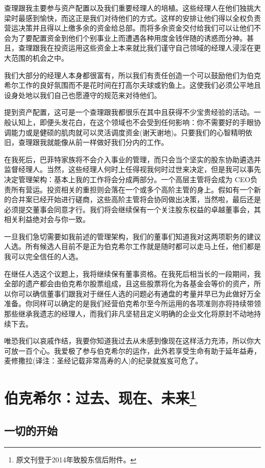 \documentclass[UTF8,a4paper,zihao=-4,fontset = windows]{ctexart} %
\begin{document}
查理跟我主要参与资产配置以及我们重要经理人的培植。这些经理人在他们独挑大梁时最感到愉快，而这正是我们对待他们的方式。这样的安排让他们得以全权负责营运决策并且得以上缴多余的资金给总部。而将多余资金交付给我们可以让他们不会为了要配置资金到他们个别事业上而遭遇各种用度金钱伴随的诱惑而分神。甚且，查理跟我在投资运用这些资金上本来就比我们谨守自己领域的经理人浸淫在更大范围的机会之中。

我们大部分的经理人本身都很富有，所以我们有责任创造一个可以鼓励他们为伯克希尔工作的良好氛围而不是花时间在打高尔夫球或钓鱼上。这使我们必须公平地且设身处地以我们自己也愿遵守的规范来对待他们。

提到资产配置，这可是一个查理跟我都很乐在其中且获得不少宝贵经验的活动。一般认知上，即便头发花白，在这个领域也不会受到任何影响：你不需要好的手眼协调能力或是健硕的肌肉就可以灵活调度资金(谢天谢地)。只要我们的心智精明依旧，查理跟我就能像从前一样做好我们分内的工作。

在我死后，巴菲特家族将不会介入事业的管理，而只会当个坚实的股东协助遴选并监督经理人。当然，这些经理人何时上任得视我何时过世来决定，但是我可以事先决定管理架构：基本上我的工作将会分成两部分。一个高层主管将会成为 CEO负责所有营运。投资相关的重担则会落在一个或多个高阶主管的身上。假如有一个新的合并案已经开始进行磋商，这些高阶主管将会协同做出决策，当然啦，最后还是必须提交董事会同意才行。我们将会继续保有一个关注股东权益的卓越董事会，其相关利益绝对会与你一致。

一旦我们急切需要如我前述的管理架构，我们的董事们知道我对这两项职务的建议人选。所有候选人目前不是正为伯克希尔工作就是随时都可以走马上任，他们都是我可以完全信任的人选。

在继任人选这个议题上，我将继续保有董事资格。在我死后相当长的一段期间，我全部的遗产都会由伯克希尔股票组成，且这些股票将化为各基金会等价的资产，所以你可以确信董事们跟我对于继任人选的问题必有通盘的考量并早已为此做好万全准备。你同样可以确定的是我们经营伯克希尔至今所运用的各项准则亦将持续带领那些继承我遗志的经理人，而我们非凡坚韧且定义明确的企业文化将原封不动地持续下去。

唯恐我们以哀戚作结，我要你知道我过去从未感到像现在这样活力充沛，所以你大可放一百个心。我爱极了参与伯克希尔的运作，此外若享受生命有助于延年益寿，麦修撒拉(译注：圣经记载非常高寿的人)的纪录就岌岌可危了。 
\section[伯克希尔：过去、现在、未来]{伯克希尔：过去、现在、未来\footnote{原文刊登于2014年致股东信后附件。}}
\subsection{一切的开始}
\end{document}
